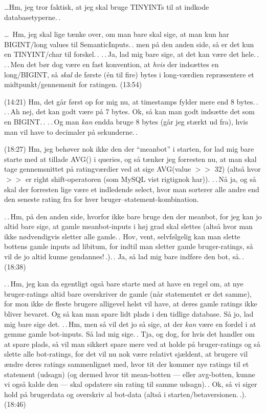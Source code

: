 \documentclass{report}
\begin{document}
\ldots Hm, jeg tror faktisk, at jeg skal bruge TINYINTs til at indkode databasetyperne.\,. %

\ldots\ Hm, jeg skal lige tænke over, om man bare skal sige, at man kun har BIGINT/long values til SemanticInputs.\,. men på den anden side, så er det kun en TINYINT/char til forskel.\,. .\,.\,Ja, lad mig bare sige, at det kan være det hele.\,. .\,.\,Men det bør dog være en fast konvention, at \emph{hvis} der indsættes en long/BIGINT, så \emph{skal} de første (én til fire) bytes i long-værdien repræsentere et midtpunkt/gennemsnit for ratingen. (13:54)

(14:21) Hm, det går først op for mig nu, at timestamps fylder mere end 8 bytes.\,. .\,.\,Ah nej, det kan godt være på 7 bytes. Ok, så kan man godt indsætte det som en BIGINT.\,. .\,.\,Og man \emph{kan} endda bruge 8 bytes (går jeg stærkt ud fra), hvis man vil have to decimaler på sekunderne.\,. 

(18:27) Hm, jeg behøver nok ikke den der ``meanbot'' i starten, for lad mig bare starte med at tillade AVG() i queries, og så tænker jeg forresten nu, at man skal tage gennemsnittet på ratingværdier ved at sige AVG(value $>>$ 32) (altså hvor $>>$ er right shift-operatoren (som MySQL vist rigtignok har)). .\,.\,Nå ja, og så skal der forresten lige være et indledende select, hvor man sorterer alle andre end den seneste rating fra for hver bruger--statement-kombination. 

.\,.\,Hm, på den anden side, hvorfor ikke bare bruge den der meanbot, for jeg kan jo altid bare sige, at gamle meanbot-inputs i høj grad skal slettes (altså hvor man ikke nødvendigvis sletter alle gamle.\,. Hov, vent, selvfølgelig kan man slette bottens gamle inputs ad libitum, for indtil man sletter gamle bruger-ratings, så vil de jo altid kunne gendannes!\,.).\,. Ja, så lad mig bare indføre den bot, så.\,. (18:38) 

.\,.\,Hm, jeg kan da egentligt også bare starte med at have en regel om, at nye bruger-ratings altid bare overskriver de gamle (når statementet er det samme), for mon ikke de fleste brugere alligevel helst vil have, at deres gamle ratings ikke bliver bevaret. Og så kan man spare lidt plads i den tidlige database. Så jo, lad mig bare sige det. .\,.\,Hm, men så vil det jo så sige, at der \emph{kan} være en fordel i at gemme gamle bot-inputs. Så lad mig sige.\,. Tja, og dog, for hvis det handler om at spare plads, så vil man sikkert spare mere ved at holde på bruger-ratings og så slette alle bot-ratings, for det vil nu nok være relativt sjældent, at brugere vil ændre deres ratings sammenlignet med, hvor tit der kommer nye ratings til et statement (udsagn) (og dermed hvor tit mean-botten --- eller avg-botten, kunne vi også kalde den --- skal opdatere sin rating til samme udsagn).\,. Ok, så vi siger hold på brugerdata og overskriv al bot-data (altså i starten/betaversionen.\,.). (18:46)
\end{document}
